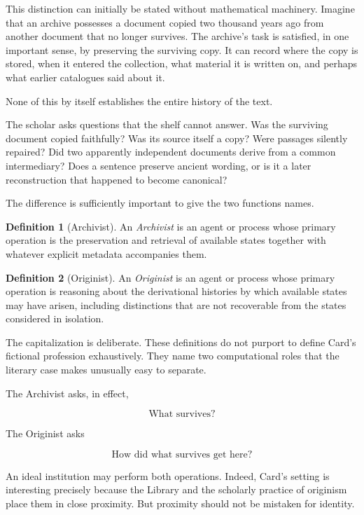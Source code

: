 \documentclass[
  11pt,
  a4paper,
  DIV=12,
  BCOR=0mm,
  parskip=half-
]{scrartcl}
\theoremstyle{definition}
\newtheorem{definition}{Definition}[section]
\theoremstyle{plain}
\theoremstyle{remark}
\begin{document}
This distinction can initially be stated without mathematical machinery.
Imagine that an archive possesses a document copied two thousand years ago
from another document that no longer survives. The archive's task is
satisfied, in one important sense, by preserving the surviving copy. It can
record where the copy is stored, when it entered the collection, what material
it is written on, and perhaps what earlier catalogues said about it.

None of this by itself establishes the entire history of the text.

The scholar asks questions that the shelf cannot answer. Was the surviving
document copied faithfully? Was its source itself a copy? Were passages
silently repaired? Did two apparently independent documents derive from a
common intermediary? Does a sentence preserve ancient wording, or is it a
later reconstruction that happened to become canonical?

The difference is sufficiently important to give the two functions names.

\begin{definition}[Archivist]
\label{def:archivist}
An \emph{Archivist} is an agent or process whose primary operation is the
preservation and retrieval of available states together with whatever
explicit metadata accompanies them.
\end{definition}

\begin{definition}[Originist]
\label{def:originist}
An \emph{Originist} is an agent or process whose primary operation is
reasoning about the derivational histories by which available states may have
arisen, including distinctions that are not recoverable from the states
considered in isolation.
\end{definition}

The capitalization is deliberate. These definitions do not purport to define
Card's fictional profession exhaustively. They name two computational roles
that the literary case makes unusually easy to separate.

The Archivist asks, in effect,

\[
  \text{What survives?}
\]

The Originist asks

\[
  \text{How did what survives get here?}
\]

An ideal institution may perform both operations. Indeed, Card's setting is
interesting precisely because the Library and the scholarly practice of
originism place them in close proximity. But proximity should not be mistaken
for identity.
\end{document}
